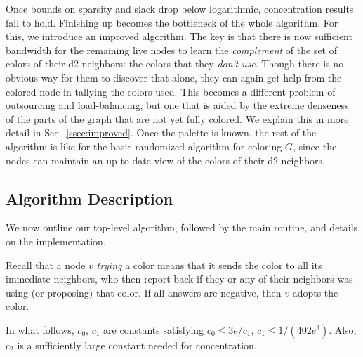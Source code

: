 Once bounds on sparsity and slack drop below logarithmic, concentration results fail to hold. 
Finishing up becomes the bottleneck of the whole algorithm.
For this, we introduce an improved algorithm. The key is that there is now sufficient bandwidth for the remaining live nodes to learn the \emph{complement} of the set of colors of their d2-neighbors: the colors that they \emph{don't use}. Though there is no obvious way for them to discover that alone, they can again get help from the colored node in tallying the colors used. This becomes a different problem of outsourcing and load-balancing, but one that is aided by the extreme denseness of the parts of the graph that are not yet fully colored. We explain this in more detail in Sec.~\ref{ssec:improved}.
Once the palette is known, the rest of the algorithm is like for the basic randomized algorithm for coloring $G$, since the nodes can maintain an up-to-date view of the colors of their d2-neighbors.


\subsection{Algorithm Description}

We now outline our top-level algorithm, followed by the main routine,  and details on the implementation. %


Recall that a node $v$ \emph{trying} a color means that it sends the color to all its immediate neighbors, who then report back if they or any of their neighbors was using (or proposing) that color.
If all answers are negative, then $v$ adopts the color. 

In what follows, $c_0$, $c_1$ are constants satisfying $c_0 \le 3e/c_1$, $c_1 \le 1/(402 e^3)$. Also, $c_2$ is a sufficiently large constant needed for concentration.

